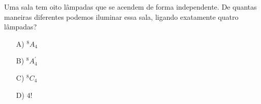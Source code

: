 Uma sala tem oito lâmpadas que se acendem de forma independente. De quantas maneiras diferentes podemos iluminar essa sala, ligando exatamente quatro lâmpadas?
\begin{enumerate}
\item [A)] $^8 A_4$
\item [B)] $^8 A^{\prime}_4$
\item [C)] $^8C_4$
\item [D)] $4!$
\end{enumerate}
